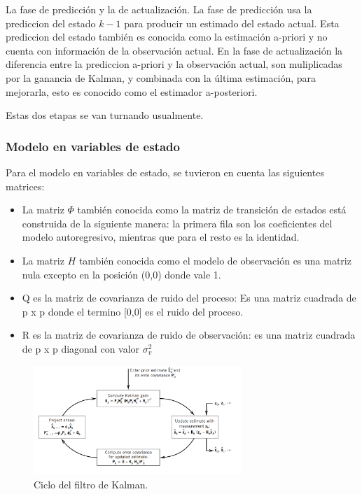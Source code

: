 La fase de predicción y la de actualización. La fase de predicción usa la prediccion del estado $k-1$ para producir un estimado del estado actual. Esta prediccion del estado también es conocida como la estimación a-priori y no cuenta con información de la observación actual.  En la fase de actualización la diferencia entre la prediccion a-priori y la observación actual, son muliplicadas por la ganancia de Kalman, y combinada con la última estimación, para mejorarla, esto es conocido como el estimador a-posteriori.

Estas dos etapas se van turnando usualmente.\\


\subsubsection{Modelo en variables de estado}
Para el modelo en variables de estado, se tuvieron en cuenta las siguientes matrices:
\begin{itemize}
\item La matriz $\Phi$ también conocida como la matriz de transición de estados está construida de la siguiente manera: la primera fila son los coeficientes del modelo autoregresivo, mientras que para el resto es la identidad.
\item La matriz $H$ también conocida como el modelo de observación es una matriz nula excepto en la posición (0,0) donde vale 1.
\item Q es la matriz de covarianza de ruido del proceso: Es una matriz cuadrada de p x p  donde el termino [0,0] es el ruido del proceso.
\item R es la matriz de covarianza de ruido de observación: es una matriz cuadrada de p x p diagonal con valor $\sigma_v^2$
\end{itemize}
\begin{figure}[H]
\centering
	\includegraphics[width=0.7\textwidth, trim = {0 0 0 0},clip]{./Imagenes/kalman_loop.png}
	\caption{Ciclo del filtro de Kalman.}
	\label{fig:kalmanfilter}
\end{figure}


